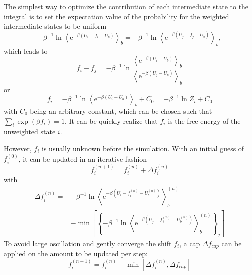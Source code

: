 The simplest way to optimize the contribution of each intermediate state to the integral is to set the expectation value of the probability for the weighted intermediate states to be uniform
\begin{equation}
	-\beta^{-1} \ln \left\langle \mathrm{e}^{-\beta\left(U_i-f_i-U_b\right)}\right\rangle_b=-\beta^{-1} \ln \left\langle\mathrm{e}^{-\beta\left(U_j-f_j-U_b\right)}\right\rangle_b,
\end{equation}
which leads to
\begin{equation}
	f_i-f_j=-\beta^{-1} \ln \frac{\left\langle\mathrm{e}^{-\beta\left(U_i-U_b\right)}\right\rangle_b}{\left\langle\mathrm{e}^{-\beta\left(U_j-U_b\right)}\right\rangle_b}
\end{equation}
or
\begin{equation}
	f_i=-\beta^{-1} \ln \left\langle\mathrm{e}^{-\beta\left(U_i-U_b\right)}\right\rangle_b+C_0=-\beta^{-1} \ln Z_i+C_0
\end{equation}
with $C_0$ being an arbitrary constant, which can be chosen such that $\sum_i \exp(\beta f_i)=1$. It can be quickly realize that $f_i$ is the free energy of the unweighted state $i$.

However, $f_i$ is usually unknown before the simulation. With an initial guess of $f_i^{(0)}$, it can be updated in an iterative fashion
\begin{equation}
	f_i^{(n+1)}=f_i^{(n)}+\Delta f_i^{(n)}
\end{equation}
with
\begin{equation}
	\begin{aligned}
		\Delta f_i^{(n)}= & -\beta^{-1} \ln \left\langle\mathrm{e}^{-\beta\left(U_i-f_i^{(n)}-U_b^{(n)}\right)}\right\rangle_b^{(n)} \\
		& -\min \left[\left\{-\beta^{-1} \ln \left\langle\mathrm{e}^{-\beta\left(U_j-f_j^{(n)}-U_b^{(n)}\right)}\right\rangle_b^{(n)}\right\}_j\right]
	\end{aligned}
\end{equation}
To avoid large oscillation and gently converge the shift $f_i$, a cap $\Delta f_{cap}$ can be applied on the amount to be updated per step:
\begin{equation}
	f_i^{(n+1)}=f_i^{(n)}+\min\left[\Delta f_i^{(n)},\Delta f_{cap}\right]
\end{equation}

